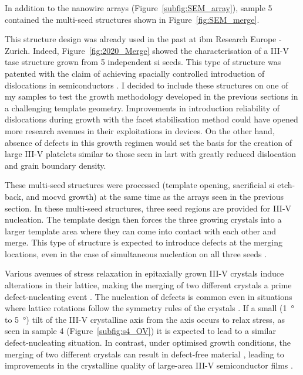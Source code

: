 In addition to the nanowire arrays (Figure~\ref{subfig:SEM_array}), sample 5 contained the multi-seed structures shown in Figure~\ref{fig:SEM_merge}. 

This structure design was already used in the past at \acs{ibm} Research Europe - Zurich. Indeed, Figure~\ref{fig:2020_Merge} showed the characterisation of a III-V \acs{tase} structure grown from \num{5} independent \acl{si} seeds. This type of structure was patented with the claim of achieving spacially controlled introduction of dislocations in semiconductors \cite{Mauthe2021}. I decided to include these structures on one of my samples to test the growth methodology developed in the previous sections in a challenging template geometry. Improvements in introduction reliability of dislocations during growth with the facet stabilisation method could have opened more research avenues in their exploitations in devices. On the other hand, absence of defects in this growth regimen would set the basis for the creation of large III-V platelets similar to those seen in \acf{lart} \cite{Yan2021, Han2020} with greatly reduced dislocation and grain boundary density.

These multi-seed structures were processed (template opening, sacrificial \acl{si} etch-back, and \acs{mocvd} growth) at the same time as the arrays seen in the previous section. In these multi-seed structures, three seed regions are provided for III-V nucleation. The template design then forces the three growing crystals into a larger template area where they can come into contact with each other and merge. This type of structure is expected to introduce defects at the merging locations, even in the case of simultaneous nucleation on all three seeds \cite{Mauthe2021}.

Various avenues of stress relaxation in epitaxially grown III-V crystals induce alterations in their lattice, making the merging of two different crystals a prime defect-nucleating event \cite{Jacobsson2015}. The nucleation of defects is common even in situations where lattice rotations follow the symmetry rules of the crystals \cite{Rossi2023}. If a small (\qty{1}{\degree} to \qty{5}{\degree}) tilt of the III-V crystalline axis from the  axis occurs to relax stress, as seen in sample 4 (Figure~\ref{subfig:s4_OV}) it is expected to lead to a similar defect-nucleating situation. In contrast, under optimised growth conditions, the merging of two different crystals can result in defect-free material \cite{Imanishi2012}, leading to improvements in the crystalline quality of large-area III-V semiconductor films \cite{Imade2014}.

